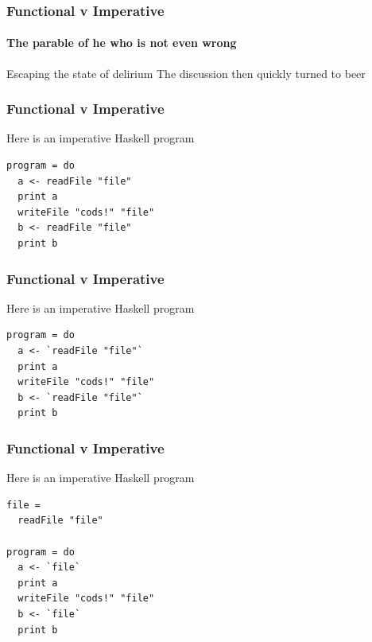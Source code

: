 {\begin{frame}
\frametitle{Functional v Imperative}
\framesubtitle{The parable of he who is not even wrong}
\begin{block}{Escaping the state of delirium}
The discussion then quickly turned to beer
\end{block}
\end{frame}
}


\begin{frame}[fragile]
\frametitle{Functional v Imperative}
\begin{block}{Here is an imperative Haskell program}
\begin{lstlisting}[style=haskell,mathescape]
program = do
  a <- readFile "file"
  print a
  writeFile "cods!" "file"
  b <- readFile "file"
  print b
\end{lstlisting}
\end{block}
\end{frame}


\begin{frame}[fragile]
\frametitle{Functional v Imperative}
\begin{block}{Here is an imperative Haskell program}
\begin{lstlisting}[style=haskell,mathescape]
program = do
  a <- `readFile "file"`
  print a
  writeFile "cods!" "file"
  b <- `readFile "file"`
  print b
\end{lstlisting}
\end{block}
\end{frame}


\begin{frame}[fragile]
\frametitle{Functional v Imperative}
\begin{block}{Here is an imperative Haskell program}
\begin{lstlisting}[style=haskell,mathescape]
file =
  readFile "file"

program = do
  a <- `file`
  print a
  writeFile "cods!" "file"
  b <- `file`
  print b
\end{lstlisting}
\end{block}
\end{frame}


